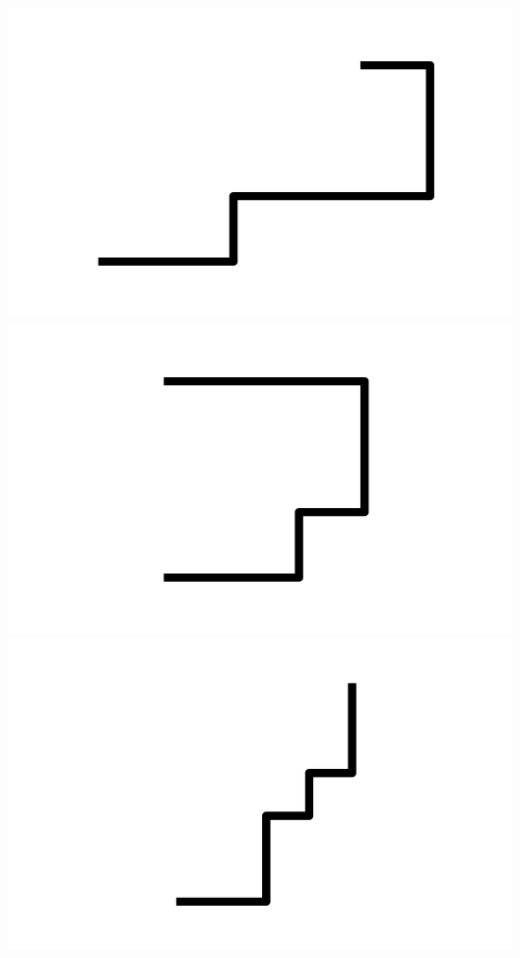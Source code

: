\documentclass[]{report}
\begin{document}
\includegraphics[scale=.1]{pictures/21/state_cluster_shapes_244.pdf} 
\includegraphics[scale=.1]{pictures/21/state_cluster_shapes_245.pdf} 
\includegraphics[scale=.1]{pictures/21/state_cluster_shapes_246.pdf} 
\end{document}
